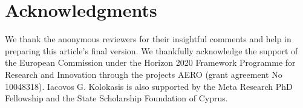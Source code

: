 \section*{Acknowledgments}
We thank the anonymous reviewers for their insightful comments and help in preparing this article's final version.
We thankfully acknowledge the support of the European Commission under the Horizon 2020 Framework Programme for Research and Innovation through the projects AERO (grant agreement No 10048318).
Iacovos G. Kolokasis is also supported by the Meta Research PhD Fellowship and the State Scholarship Foundation of Cyprus.
